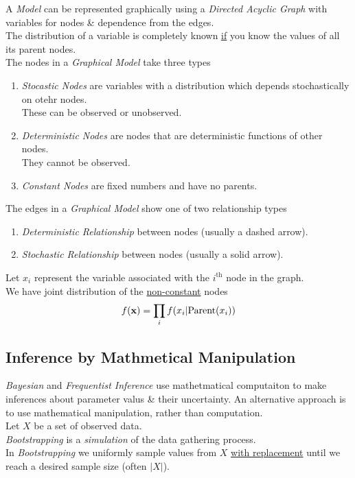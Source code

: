 \documentclass[11pt,a4paper]{article}
\begin{document}
A \textit{Model} can be represented graphically using a \textit{Directed Acyclic Graph} with variables for nodes \& dependence from the edges.\\
The distribution of a variable is completely known \underline{if} you know the values of all its parent nodes.\\
The nodes in a \textit{Graphical Model} take three types
\begin{enumerate}
	\item \textit{Stocastic Nodes} are variables with a distribution which depends stochastically on otehr nodes.\\
These can be observed or unobserved.
	\item \textit{Deterministic Nodes} are nodes that are deterministic functions of other nodes.\\
They cannot be observed.
	\item \textit{Constant Nodes} are fixed numbers and have no parents.
\end{enumerate}
The edges in a \textit{Graphical Model} show one of two relationship types
\begin{enumerate}
	\item \textit{Deterministic Relationship} between nodes (usually a dashed arrow).
	\item \textit{Stochastic Relationship} between nodes (usually a solid arrow).
\end{enumerate}

Let $x_i$ represent the variable associated with the $i^\text{th}$ node in the graph.\\
We have joint distribution of the \underline{non-constant} nodes
$$f(\textbf{x})=\prod_if(x_i|\text{Parent}(x_i))$$

\subsection{Inference by Mathmetical Manipulation}


\textit{Bayesian} and \textit{Frequentist Inference} use mathetmatical computaiton to make inferences about parameter valus \& their uncertainty. An alternative approach is to use mathematical manipulation, rather than computation.\\

Let $X$ be a set of observed data.\\
\textit{Bootstrapping} is a \textit{simulation} of the data gathering process.\\
In \textit{Bootstrapping} we uniformly sample values from $X$ \underline{with replacement} until we reach a desired sample size (often $|X|$).\\
\end{document}
